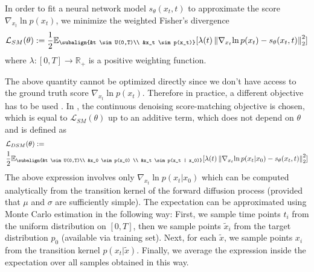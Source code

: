 In order to fit a neural network model $s_\theta(x_t,t)$ to approximate the score $\nabla_{x_t}{\ln{p(x_t)}}$, we minimize the weighted Fisher's divergence
\begin{gather}
    \mathcal{L}_{SM}(\theta) := \frac{1}{2} \mathbb{E}_{\subalign{&t \sim U(0,T)\\ &x_t \sim p(x_t)}} [\lambda(t) \norm{\nabla_{x_t}{\ln{p(x_t)}} - s_\theta(x_t,t)}_2^2]
\end{gather}
where $\lambda: [0,T] \xrightarrow{} \mathbb{R}_+$ is a positive weighting function.

The above quantity cannot be optimized directly since we don't have access to the ground truth score $\nabla_{x_t}{\ln{p(x_t)}}$. Therefore in practice, a different objective has to be used \cite{hyvarinen2005score_original, song2020generative_score, song2021sde}. In \cite{song2021sde}, the continuous denoising score-matching objective is chosen, which is equal to $\mathcal{L}_{SM}(\theta)$ up to an additive term, which does not depend on $\theta$ and is defined as 
\begin{gather}
\begin{aligned}
    &\mathcal{L}_{DSM}(\theta) := \\ 
    &\frac{1}{2} \mathbb{E}_{\subalign{&t \sim U(0,T)\\ &x_0 \sim p(x_0) \\ &x_t \sim p(x_t | x_0)}} [\lambda(t) \norm{\nabla_{x_t}{\ln{p(x_t | x_0)}} - s_\theta(x_t,t)}_2^2]
\end{aligned}
\end{gather}
The above expression involves only $\nabla_{x_t}{\ln{p(x_t | x_0)}}$ which can be computed analytically from the transition kernel of the forward diffusion process (provided that $\mu$ and $\sigma$ are sufficiently simple). The expectation can be approximated using Monte Carlo estimation in the following way: First, we sample time points $t_i$ from the uniform distribution on $[0,T]$, then we sample points $\tilde{x}_i$ from the target distribution $p_0$ (available via training set). Next, for each $\tilde{x}$, we sample points $x_i$ from the transition kernel $p(x_t | \tilde{x})$. Finally, we average the expression inside the expectation over all samples obtained in this way.

